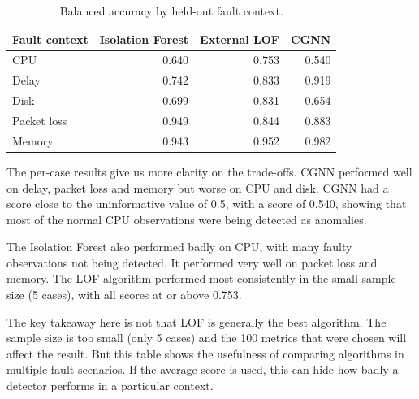 \begin{table}[H]
    \centering
    \small
    \caption{Balanced accuracy by held-out fault context.}
    \label{tab:h9-rcaeval-balanced-by-fault}
    \begin{tabular}{|l|r|r|r|}
        \hline
        Fault context & Isolation Forest & External LOF & CGNN \\
        \hline
        CPU & 0.640 & 0.753 & 0.540 \\
        Delay & 0.742 & 0.833 & 0.919 \\
        Disk & 0.699 & 0.831 & 0.654 \\
        Packet loss & 0.949 & 0.844 & 0.883 \\
        Memory & 0.943 & 0.952 & 0.982 \\
        \hline
    \end{tabular}
\end{table}




The per-case results give us more clarity on the trade-offs. CGNN performed well on delay, packet loss and memory but worse on CPU and disk. CGNN had a score close to the uninformative value of 0.5, with a score of 0.540, showing that most of the normal CPU observations were being detected as anomalies.

The Isolation Forest also performed badly on CPU, with many faulty observations not being detected. It performed very well on packet loss and memory. The LOF algorithm performed most consistently in the small sample size (5 cases), with all scores at or above 0.753.

The key takeaway here is not that LOF is generally the best algorithm. The sample size is too small (only 5 cases) and the 100 metrics that were chosen will affect the result. But this table shows the usefulness of comparing algorithms in multiple fault scenarios. If the average score is used, this can hide how badly a detector performs in a particular context.




